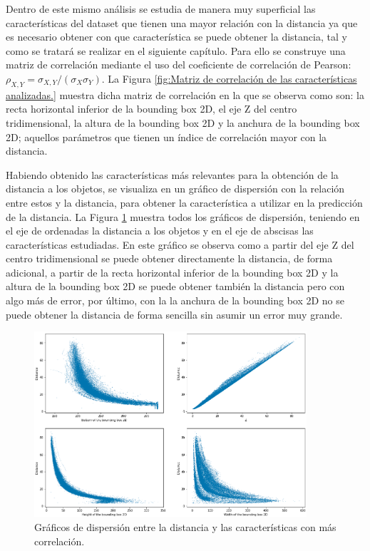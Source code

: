 Dentro de este mismo análisis se estudia de manera muy superficial las características del dataset que tienen una mayor relación con la distancia ya que es necesario obtener con que característica se puede obtener la distancia, tal y como se tratará se realizar en el siguiente capítulo. Para ello se construye una matriz de correlación mediante el uso del coeficiente de correlación de Pearson: $\rho_{X,Y} = \sigma_{X,Y}/(\sigma_X \sigma_Y)$. La Figura \ref{fig:Matriz de correlación de las características analizadas.} muestra dicha matriz de correlación en la que se observa como son: la recta horizontal inferior de la bounding box 2D, el eje Z del centro tridimensional, la altura de la bounding box 2D y la anchura de la bounding box 2D; aquellos parámetros que tienen un índice de correlación mayor con la distancia.

Habiendo obtenido las características más relevantes para la obtención de la distancia a los objetos, se visualiza en un gráfico de dispersión con la relación entre estos y la distancia, para obtener la característica a utilizar en la predicción de la distancia. La Figura \ref{fig:Gráficos de dispersión entre la distancia y las características con más correlación.} muestra todos los gráficos de dispersión, teniendo en el eje de ordenadas la distancia a los objetos y en el eje de abscisas las características estudiadas. En este gráfico se observa como a partir del eje Z del centro tridimensional se puede obtener directamente la distancia, de forma adicional, a partir de la recta horizontal inferior de la bounding box 2D y la altura de la bounding box 2D se puede obtener también la distancia pero con algo más de error, por último, con la la anchura de la bounding box 2D no se puede obtener la distancia de forma sencilla sin asumir un error muy grande.

\begin{figure}[H]
    \centering
    \includegraphics[width=0.9\textwidth]{Book/figures/6_approx_distancia/metrics_to_get_distance_kitti.png}
    \caption{Gráficos de dispersión entre la distancia y las características con más correlación.}
    \label{fig:Gráficos de dispersión entre la distancia y las características con más correlación.}
\end{figure}


